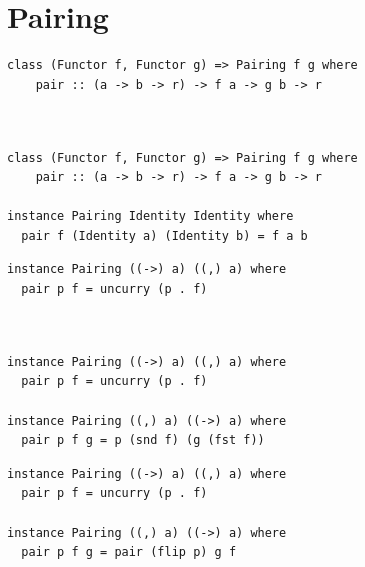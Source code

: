\documentclass{beamer}
\begin{document}
\section{Pairing}

\begin{frame}[fragile]
  \begin{overprint}
  \begin{verbatim}
class (Functor f, Functor g) => Pairing f g where
    pair :: (a -> b -> r) -> f a -> g b -> r



  \end{verbatim}
  \begin{verbatim}
class (Functor f, Functor g) => Pairing f g where
    pair :: (a -> b -> r) -> f a -> g b -> r

instance Pairing Identity Identity where
  pair f (Identity a) (Identity b) = f a b
  \end{verbatim}
  \end{overprint}
\end{frame}

\begin{frame}[fragile]
  \begin{overprint}
  \begin{verbatim}
instance Pairing ((->) a) ((,) a) where
  pair p f = uncurry (p . f)



  \end{verbatim}
  \begin{verbatim}
instance Pairing ((->) a) ((,) a) where
  pair p f = uncurry (p . f)

instance Pairing ((,) a) ((->) a) where
  pair p f g = p (snd f) (g (fst f))
  \end{verbatim}
  \begin{verbatim}
instance Pairing ((->) a) ((,) a) where
  pair p f = uncurry (p . f)

instance Pairing ((,) a) ((->) a) where
  pair p f g = pair (flip p) g f
  \end{verbatim}
  \end{overprint}
\end{frame}
\end{document}
